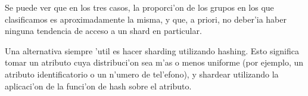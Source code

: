 Se puede ver que en los tres casos, la proporci'on de los grupos en los que clasificamos es aproximadamente la misma, y que, a priori, no deber'ia haber ninguna tendencia de acceso a un shard en particular.

Una alternativa siempre 'util es hacer sharding utilizando hashing. Esto significa tomar un atributo cuya distribuci'on sea m'as o menos uniforme (por ejemplo, un atributo identificatorio o un n'umero de tel'efono), y shardear utilizando la aplicaci'on de la funci'on de hash sobre el atributo. 